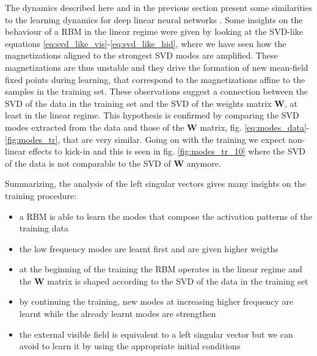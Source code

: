 \documentclass[notitlepage]{revtex4-1}
\begin{document}
The dynamics described here and in the previous section present some similarities to the learning dynamics for deep linear neural networks \cite{ganguli}. Some insights on the behaviour of a RBM in the linear regime were given by looking at the SVD-like equations \eqref{eq:svd_like_vis}-\eqref{eq:svd_like_hid}, where we have seen how the magnetizations aligned to the strongest SVD modes are amplified. These magnetizations are thus unstable and they drive the formation of new mean-field fixed points during learning, that correspond to the magnetizations affine to the samples in the training set. These observations suggest a connection between the SVD of the data in the training set and the SVD of the weights matrix \(\mathbf{W}\), at least in the linear regime. This hypothesis is confirmed by comparing the SVD modes extracted from the data and those of the \(\mathbf{W}\) matrix, fig. \ref{eq:modes_data}-\ref{fig:modes_tr}, that are very similar. Going on with the training we expect non-linear effects to kick-in and this is seen in fig. \ref{fig:modes_tr_10} where the SVD of the data is not comparable to the SVD of \(\mathbf{W}\) anymore.

Summarizing, the analysis of the left singular vectors gives many insights on the training procedure:

\begin{itemize}
\item a RBM is able to learn the modes that compose the activation patterns of the training data
\item the low frequency modes are learnt first and are given higher weigths
\item at the beginning of the training the RBM operates in the linear regime and the \(\mathbf{W}\) matrix is shaped according to the SVD of the data in the training set
\item by continuing the training, new modes at increasing higher frequency are learnt while the already learnt modes are strengthen
\item the external visible field is equivalent to a left singular vector but we can avoid to learn it by using the appropriate initial conditions
\end{itemize}
\end{document}
